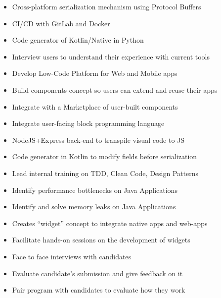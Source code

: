 \documentclass[10pt,letterpaper,ragged2d,withhyper]{altacv}
\begin{document}
\begin{paracol}{2}

\begin{itemize}
\item Cross-platform serialization mechanism using Protocol Buffers
\item CI/CD with GitLab and Docker
\item Code generator of Kotlin/Native in Python
\item Interview users to understand their experience with current tools
\item Develop Low-Code Platform for Web and Mobile apps
\item Build components concept so users can extend and reuse their apps
\item Integrate with a Marketplace of user-built components
\item Integrate user-facing block programming language
\item NodeJS+Express back-end to transpile visual code to JS
\item Code generator in Kotlin to modify fields before serialization
\item Lead internal training on TDD, Clean Code, Design Patterns
\item Identify performance bottlenecks on Java Applications
\item Identify and solve memory leaks on Java Applications
\item Creates ``widget'' concept to integrate native apps and web-apps
\item Facilitate hands-on sessions on the development of widgets
\item Face to face interviews with candidates
\item Evaluate candidate's submission and give feedback on it
\item Pair program with candidates to evaluate how they work
\end{itemize}



\end{paracol}
\end{document}
